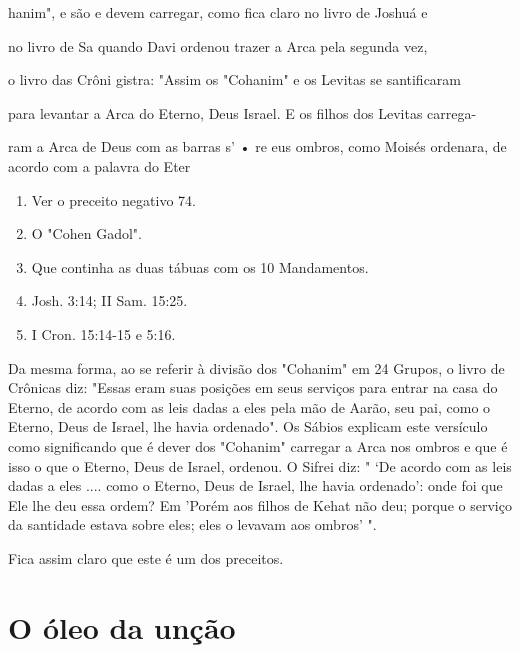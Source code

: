 \begin{itemize}
\begin{enumrate}
\begin{itemize}
\begin{itemize}
hanim", e são e devem carregar, como fica claro no livro de Joshuá e

no livro de Sa quando Davi ordenou trazer a Arca pela segunda vez,

o livro das Crôni gistra: "Assim os "Cohanim" e os Levitas se
santificaram

para levantar a Arca do Eterno, Deus Israel. E os filhos dos Levitas
carrega-

ram a Arca de Deus com as barras s' • re eus ombros, como Moisés
ordenara, de acordo com a palavra do Eter


\begin{enumerate}
\def\labelenumi{\arabic{enumi}.}
\setcounter{enumi}{52}
\item
 
 Ver o preceito negativo 74.
 
\item
 
 O "Cohen Gadol".
 
\item
 
 Que continha as duas tábuas com os 10 Mandamentos.
 
\item
 
 Josh. 3:14; II Sam. 15:25.
 
\item
 
 I Cron. 15:14-15 e 5:16.
 
\end{enumerate}

Da mesma forma, ao se referir à divisão dos "Cohanim" em 24 Gru­pos, o
livro de Crônicas diz: "Essas eram suas posições em seus serviços para
entrar na casa do Eterno, de acordo com as leis dadas a eles pela mão de
Aarão, seu pai, como o Eterno, Deus de Israel, lhe havia ordenado". Os
Sábios expli­cam este versículo como significando que é dever dos
"Cohanim" carregar a Arca nos ombros e que é isso o que o Eterno, Deus
de Israel, ordenou. O Sifrei diz: " `De acordo com as leis dadas a eles
.... como o Eterno, Deus de Israel, lhe havia ordenado': onde foi que
Ele lhe deu essa ordem? Em 'Porém aos fi­lhos de Kehat não deu; porque o
serviço da santidade estava sobre eles; eles o levavam aos ombros' ".

Fica assim claro que este é um dos preceitos.

\section{O óleo da unção}


\end{itemize}
\end{itemize}
\end{enumrate}
\end{itemize}
